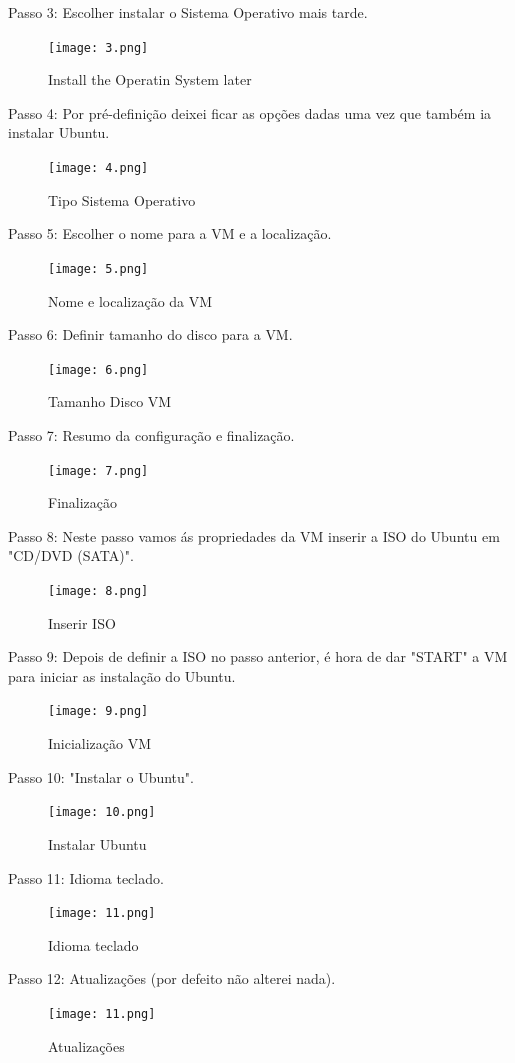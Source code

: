 \newpage
Passo 3: Escolher instalar o Sistema Operativo mais tarde.
\begin{figure}[H]
\center
\texttt{[image: 3.png]}
\caption{Install the Operatin System later}
\end{figure}

Passo 4: Por pré-definição deixei ficar as opções dadas uma vez que também ia instalar Ubuntu.
\begin{figure}[H]
\center
\texttt{[image: 4.png]}
\caption{Tipo Sistema Operativo}
\end{figure}

\newpage
Passo 5: Escolher o nome para a \ac{VM} e a localização.
\begin{figure}[H]
\center
\texttt{[image: 5.png]}
\caption{Nome e localização da \ac{VM}}
\end{figure}

Passo 6: Definir tamanho do disco para a \ac{VM}.
\begin{figure}[H]
\center
\texttt{[image: 6.png]}
\caption{Tamanho Disco \ac{VM}}
\end{figure}

\newpage
Passo 7: Resumo da configuração e finalização.
\begin{figure}[H]
\center
\texttt{[image: 7.png]}
\caption{Finalização}
\end{figure}

Passo 8: Neste passo vamos ás propriedades da \ac{VM} inserir a \ac{ISO} do Ubuntu em "\ac{CD/DVD} (\ac{SATA})".
\begin{figure}[H]
\center
\texttt{[image: 8.png]}
\caption{Inserir \ac{ISO}}
\end{figure}


\newpage
Passo 9: Depois de definir a \ac{ISO} no passo anterior, é hora de dar "START" a \ac{VM} para iniciar as instalação do Ubuntu.
\begin{figure}[H]
\center
\texttt{[image: 9.png]}
\caption{Inicialização VM}
\end{figure}

Passo 10: "Instalar o Ubuntu".
\begin{figure}[H]
\center
\texttt{[image: 10.png]}
\caption{Instalar Ubuntu}
\end{figure}

\newpage
Passo 11: Idioma teclado.
\begin{figure}[H]
\center
\texttt{[image: 11.png]}
\caption{Idioma teclado}
\end{figure}

Passo 12: Atualizações (por defeito não alterei nada).
\begin{figure}[H]
\center
\texttt{[image: 11.png]}
\caption{Atualizações}
\end{figure}


